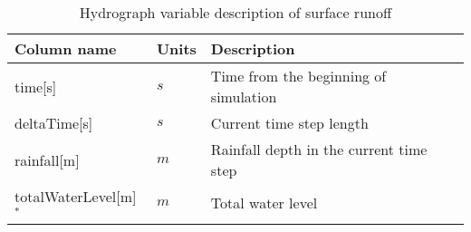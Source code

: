 \begin{table}[t]
 

 \centering
 \caption{Hydrograph variable description of surface runoff}
\label{tab:hydrographs}
\begin{tabular}{llp{}}
  \hline  \hline
 Column name  & Units      & Description       \\
  \hline
 time[s]          &   $s$      &  Time from the beginning of simulation          \\
 deltaTime[s]     &   $s$        &  Current time step length  \\
 rainfall[m]      &  $m$         &  Rainfall depth in the current time step \\
 totalWaterLevel[m]$^*$   &   $m$   &  Total water level  \\

\end{tabular}
\end{table}
